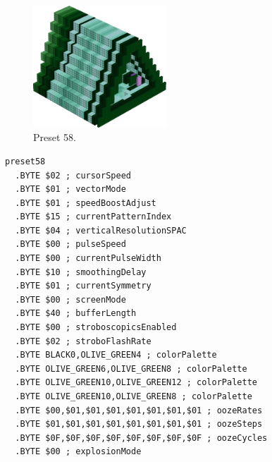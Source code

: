 \begin{minipage}[b]{0.48\linewidth}
\begin{figure}[H]                                                          
  \centering                                                             
  \begin{adjustbox}{width=5cm,center}                                   
  \includegraphics[width=5cm]{src/colorspace_presets/preset58-45.png}%
  \end{adjustbox}                                                        
\caption*{Preset 58.}                                           
\end{figure}                                                               
\end{minipage}
\hspace{0.1cm}
\begin{minipage}[b]{0.48\linewidth}                                       
\begin{lstlisting}[basicstyle=\ttfamily\tiny]
preset58
  .BYTE $02 ; cursorSpeed
  .BYTE $01 ; vectorMode
  .BYTE $01 ; speedBoostAdjust
  .BYTE $15 ; currentPatternIndex
  .BYTE $04 ; verticalResolutionSPAC
  .BYTE $00 ; pulseSpeed
  .BYTE $00 ; currentPulseWidth
  .BYTE $10 ; smoothingDelay
  .BYTE $01 ; currentSymmetry
  .BYTE $00 ; screenMode
  .BYTE $40 ; bufferLength
  .BYTE $00 ; stroboscopicsEnabled
  .BYTE $02 ; stroboFlashRate
  .BYTE BLACK0,OLIVE_GREEN4 ; colorPalette
  .BYTE OLIVE_GREEN6,OLIVE_GREEN8 ; colorPalette
  .BYTE OLIVE_GREEN10,OLIVE_GREEN12 ; colorPalette
  .BYTE OLIVE_GREEN10,OLIVE_GREEN8 ; colorPalette
  .BYTE $00,$01,$01,$01,$01,$01,$01,$01 ; oozeRates
  .BYTE $01,$01,$01,$01,$01,$01,$01,$01 ; oozeSteps
  .BYTE $0F,$0F,$0F,$0F,$0F,$0F,$0F,$0F ; oozeCycles
  .BYTE $00 ; explosionMode
\end{lstlisting}
\end{minipage}

